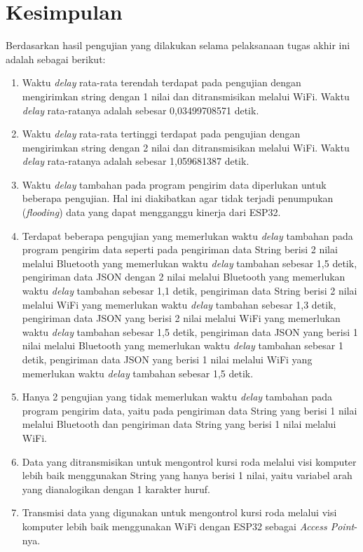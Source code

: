 \section{Kesimpulan}
\label{sec:kesimpulan}

Berdasarkan hasil pengujian yang dilakukan selama pelaksanaan tugas akhir ini adalah sebagai berikut:

\begin{enumerate}

  \item Waktu \emph{delay} rata-rata terendah terdapat pada pengujian dengan mengirimkan string dengan 1 nilai dan ditransmisikan melalui WiFi. Waktu \emph{delay} rata-ratanya adalah sebesar 0,03499708571 detik.

  \item Waktu \emph{delay} rata-rata tertinggi terdapat pada pengujian dengan mengirimkan string dengan 2 nilai dan ditransmisikan melalui WiFi. Waktu \emph{delay} rata-ratanya adalah sebesar 1,059681387 detik.
  
  \item Waktu \emph{delay} tambahan pada program pengirim data diperlukan untuk beberapa pengujian. Hal ini diakibatkan agar tidak terjadi penumpukan (\emph{flooding}) data yang dapat mengganggu kinerja dari ESP32.

  \item Terdapat beberapa pengujian yang memerlukan waktu \emph{delay} tambahan pada program pengirim data seperti pada pengiriman data String berisi 2 nilai melalui Bluetooth yang memerlukan waktu \emph{delay} tambahan sebesar 1,5 detik, pengiriman data JSON dengan 2 nilai melalui Bluetooth yang memerlukan waktu \emph{delay} tambahan sebesar 1,1 detik, pengiriman data String berisi 2 nilai melalui WiFi yang memerlukan waktu \emph{delay} tambahan sebesar 1,3 detik, pengiriman data JSON yang berisi 2 nilai melalui WiFi yang memerlukan waktu \emph{delay} tambahan sebesar 1,5 detik, pengiriman data JSON yang berisi 1 nilai melalui Bluetooth yang memerlukan waktu \emph{delay} tambahan sebesar 1 detik, pengiriman data JSON yang berisi 1 nilai melalui WiFi yang memerlukan waktu \emph{delay} tambahan sebesar 1,5 detik.
  
  \item Hanya 2 pengujian yang tidak memerlukan waktu \emph{delay} tambahan pada program pengirim data, yaitu pada pengiriman data String yang berisi 1 nilai melalui Bluetooth dan pengiriman data String yang berisi 1 nilai melalui WiFi. 
  
  \item Data yang ditransmisikan untuk mengontrol kursi roda melalui visi komputer lebih baik menggunakan String yang hanya berisi 1 nilai, yaitu variabel arah yang dianalogikan dengan 1 karakter huruf. 
  
  \item Transmisi data yang digunakan untuk mengontrol kursi roda melalui visi komputer lebih baik menggunakan WiFi dengan ESP32 sebagai \emph{Access Point}-nya.

\end{enumerate}

